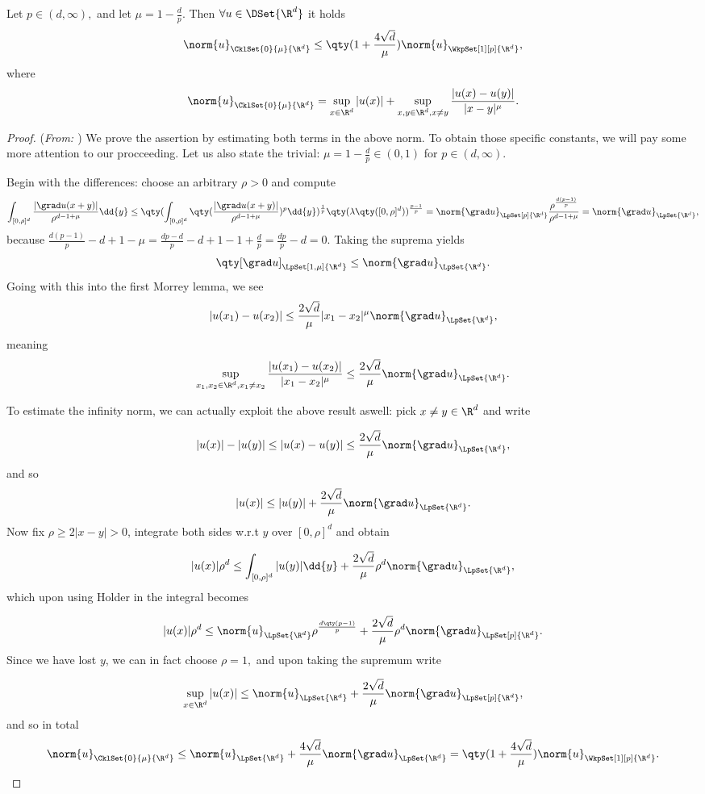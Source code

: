 \begin{lemma}
	Let $p \in (d, \infty),$ and let $\mu = 1 - \frac{d}{p}.$ Then $\forall u \in \DSet{\R^{d}}$ it holds
	\[
		\norm{u}_{\CklSet{0}{\mu}{\R^{d}}} \leq \qty(1+ \frac{4 \sqrt{d}}{\mu})\norm{u}_{\WkpSet[1][p]{\R^{d}}},
	\]
	where
	\[
		\norm{u}_{\CklSet{0}{\mu}{\R^{d}}} = \sup_{x \in \R^{d}}|u(x)| + \sup_{x,y \in \R^{d}, x \neq y}\frac{|u(x)-u(y)|}{|x-y|^{\mu}}.
	\]
\end{lemma}
\begin{proof}(\textit{From: \cite{bulicekUvodModerniTeorie2018}})
	We prove the assertion by estimating both terms in the above norm. To obtain those specific constants, we will pay some more attention to our procceeding. Let us also state the trivial: $\mu = 1 - \frac{d}{p} \in (0,1)$ for $p \in (d, \infty).$

	Begin with the differences: choose an arbitrary $\rho>0$ and compute
	\[
		\int_{[0,\rho]^d}\frac{|\grad u(x+y)|}{\rho^{d-1 + \mu}}\dd{y} \leq \qty(\int_{[0,\rho]^d}\qty(\frac{|\grad u(x+y)| }{\rho^{d-1+\mu}})^{p}\dd{y})^{\frac{1}{p}}\qty(\lambda\qty([0,\rho]^d))^{\frac{p-1}{p}} = \norm{\grad u}_{\LpSet[p]{\R^{d}}} \frac{\rho^{\frac{d(p-1)}{p}}}{\rho^{d-1+\mu}} = \norm{\grad u}_{\LpSet{\R^{d}}},
	\]
	because $\frac{d(p-1)}{p}-d+1-\mu = \frac{dp - d}{p} -d +1 -1 + \frac{d}{p} = \frac{dp}{p}-d = 0.$ Taking the suprema yields
	\[
		\qty[\grad u]_{\LpSet[1,\mu]{\R^{d}}} \leq \norm{\grad u}_{\LpSet{\R^{d}}}.
	\]
	Going with this into the first Morrey lemma, we see
	\[
		|u(x_1) - u(x_2)| \leq \frac{2 \sqrt{d}}{\mu} |x_1 - x_2|^{\mu}\norm{\grad u}_{\LpSet{\R^{d}}},
	\]
	meaning
	\[
		\sup_{x_1, x_2 \in \R^{d}, x_1 \neq x_2}\frac{|u(x_1) - u(x_2)|}{|x_1-x_2|^{\mu}} \leq \frac{2 \sqrt{d}}{\mu}\norm{\grad u}_{\LpSet{\R^{d}}}.
	\]

	To estimate the infinity norm, we can actually exploit the above result aswell: pick $x \neq y \in \R^{d}$ and write 

	\[
		|u(x)| - |u(y)| \leq |u(x) - u(y)| \leq \frac{2 \sqrt{d}}{\mu} \norm{\grad u}_{\LpSet{\R^{d}}},
	\]
	and so
	\[
		|u(x)| \leq |u(y)| + \frac{2 \sqrt{d}}{\mu} \norm{\grad u}_{\LpSet{\R^{d}}}.
	\]
	Now fix $\rho \geq 2 |x-y| > 0$, integrate both sides w.r.t $y$ over $[0,\rho]^d$ and obtain

	\[
		|u(x)| \rho^d \leq \int_{[0,\rho]^d}|u(y)|\dd{y} + \frac{2 \sqrt{d}}{\mu}\rho^d \norm{\grad u}_{\LpSet{\R^{d}}},
	\]
	which upon using Holder in the integral becomes

	\[
		|u(x)| \rho^d \leq \norm{u}_{\LpSet{\R^{d}}} \rho^{\frac{d\qty(p-1)}{p}} + \frac{2 \sqrt{d}}{\mu}\rho^{d} \norm{\grad u}_{\LpSet[p]{\R^{d}}}.
	\]
	Since we have lost $y$, we can in fact choose $\rho = 1,$ and upon taking the supremum write

	\[
		\sup_{x\in \R^{d}} |u(x)| \leq \norm{u}_{\LpSet{\R^{d}}} + \frac{2 \sqrt{d}}{\mu} \norm{\grad u}_{\LpSet[p]{\R^{d}}},
	\]
	and so in total
	\[
		\norm{u}_{\CklSet{0}{\mu}{\R^{d}}} \leq \norm{u}_{\LpSet{\R^{d}}} + \frac{4 \sqrt{d}}{\mu}\norm{\grad u}_{\LpSet{\R^{d}}} = \qty(1+\frac{4 \sqrt{d}}{\mu})\norm{u}_{\WkpSet[1][p]{\R^{d}}}.
	\]
\end{proof}

